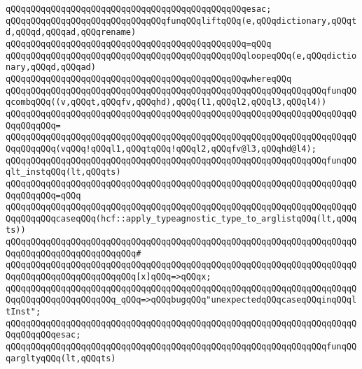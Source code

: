 \verb|qQQqqQQqqQQqqQQqqQQqqQQqqQQqqQQqqQQqqQQqqQQqqQQqesac;|\newline
\newline
\newline
\verb|qQQqqQQqqQQqqQQqqQQqqQQqqQQqqQQqfunqQQqliftqQQq(e,qQQqdictionary,qQQqtd,qQQqd,qQQqad,qQQqrename)|\newline
\verb|qQQqqQQqqQQqqQQqqQQqqQQqqQQqqQQqqQQqqQQqqQQqqQQq=qQQq|\newline
\verb|qQQqqQQqqQQqqQQqqQQqqQQqqQQqqQQqqQQqqQQqqQQqqQQqloopeqQQq(e,qQQqdictionary,qQQqd,qQQqad)|\newline
\verb|qQQqqQQqqQQqqQQqqQQqqQQqqQQqqQQqqQQqqQQqqQQqqQQqwhereqQQq|\newline
\newline
\verb|qQQqqQQqqQQqqQQqqQQqqQQqqQQqqQQqqQQqqQQqqQQqqQQqqQQqqQQqqQQqqQQqfunqQQqcombqQQq((v,qQQqt,qQQqfv,qQQqhd),qQQq(l1,qQQql2,qQQql3,qQQql4))|\newline
\verb|qQQqqQQqqQQqqQQqqQQqqQQqqQQqqQQqqQQqqQQqqQQqqQQqqQQqqQQqqQQqqQQqqQQqqQQqqQQqqQQq=|\newline
\verb|qQQqqQQqqQQqqQQqqQQqqQQqqQQqqQQqqQQqqQQqqQQqqQQqqQQqqQQqqQQqqQQqqQQqqQQqqQQqqQQq(vqQQq!qQQql1,qQQqtqQQq!qQQql2,qQQqfv@l3,qQQqhd@l4);|\newline
\newline
\verb|qQQqqQQqqQQqqQQqqQQqqQQqqQQqqQQqqQQqqQQqqQQqqQQqqQQqqQQqqQQqqQQqfunqQQqlt_instqQQq(lt,qQQqts)|\newline
\verb|qQQqqQQqqQQqqQQqqQQqqQQqqQQqqQQqqQQqqQQqqQQqqQQqqQQqqQQqqQQqqQQqqQQqqQQqqQQqqQQq=qQQq|\newline
\verb|qQQqqQQqqQQqqQQqqQQqqQQqqQQqqQQqqQQqqQQqqQQqqQQqqQQqqQQqqQQqqQQqqQQqqQQqqQQqqQQqcaseqQQq(hcf::apply_typeagnostic_type_to_arglistqQQq(lt,qQQqts))|\newline
\verb|qQQqqQQqqQQqqQQqqQQqqQQqqQQqqQQqqQQqqQQqqQQqqQQqqQQqqQQqqQQqqQQqqQQqqQQqqQQqqQQqqQQqqQQqqQQqqQQq#|\newline
\verb|qQQqqQQqqQQqqQQqqQQqqQQqqQQqqQQqqQQqqQQqqQQqqQQqqQQqqQQqqQQqqQQqqQQqqQQqqQQqqQQqqQQqqQQqqQQqqQQq[x]qQQq=>qQQqx;|\newline
\verb|qQQqqQQqqQQqqQQqqQQqqQQqqQQqqQQqqQQqqQQqqQQqqQQqqQQqqQQqqQQqqQQqqQQqqQQqqQQqqQQqqQQqqQQqqQQq_qQQq=>qQQqbugqQQq"unexpectedqQQqcaseqQQqinqQQqltInst";|\newline
\verb|qQQqqQQqqQQqqQQqqQQqqQQqqQQqqQQqqQQqqQQqqQQqqQQqqQQqqQQqqQQqqQQqqQQqqQQqqQQqqQQqesac;|\newline
\newline
\verb|qQQqqQQqqQQqqQQqqQQqqQQqqQQqqQQqqQQqqQQqqQQqqQQqqQQqqQQqqQQqqQQqfunqQQqargltyqQQq(lt,qQQqts)|\newline
